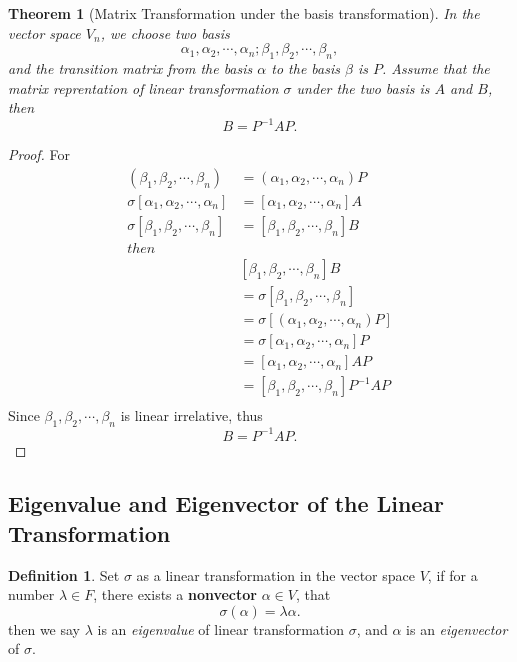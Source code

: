 \documentclass{article}
\newtheorem{theorem}{Theorem}[section]
\theoremstyle{definition}
\newtheorem{defi}{Definition}[section]
\begin{document}
\begin{theorem}[Matrix Transformation under the basis transformation]
    In the vector space $V_{n}$, we choose two basis
    $$\alpha_{1},\alpha_{2},\cdots,\alpha_{n};\beta_{1},\beta_{2},\cdots,\beta_{n},$$
    and the transition matrix from the basis $\alpha$ to the basis $\beta$ is $P$.
    Assume that the matrix reprentation of linear transformation $\sigma$ under the two basis 
    is $A$ and $B$, then 
    $$B=P^{-1}AP.$$
\label{MatrixTransUnderBasisTrans}
\end{theorem}

\begin{proof}
    For 
    \begin{align*}
        (\beta_{1},\beta_{2},\cdots,\beta_{n}) & = (\alpha_{1},\alpha_{2},\cdots,\alpha_{n})P\\
        \sigma[\alpha_{1},\alpha_{2},\cdots,\alpha_{n}] & = [\alpha_{1},\alpha_{2},\cdots,\alpha_{n}]A\\
        \sigma[\beta_{1},\beta_{2},\cdots,\beta_{n}] & = [\beta_{1},\beta_{2},\cdots,\beta_{n}]B\\
        then \\
        & [\beta_{1},\beta_{2},\cdots,\beta_{n}]B\\
        & =\sigma[\beta_{1},\beta_{2},\cdots,\beta_{n}]\\
        & =\sigma[(\alpha_{1},\alpha_{2},\cdots,\alpha_{n})P]\\
        & =\sigma[\alpha_{1},\alpha_{2},\cdots,\alpha_{n}]P\\
        & =[\alpha_{1},\alpha_{2},\cdots,\alpha_{n}]AP\\
        & =[\beta_{1},\beta_{2},\cdots,\beta_{n}]P^{-1}AP\\
    \end{align*}
    Since $\beta_{1},\beta_{2},\cdots,\beta_{n}$ is linear irrelative, 
    thus $$B=P^{-1}AP.$$
\end{proof}

\subsection{Eigenvalue and Eigenvector of the Linear Transformation}

\begin{defi}
    Set $\sigma$ as a linear transformation in the vector space $V$,
    if for a number $\lambda\in F$, there exists a \textbf{nonvector} $\alpha\in V$,
    that 
    $$\sigma(\alpha)=\lambda\alpha.$$
    then we say $\lambda$ is an \textit{eigenvalue} of linear transformation $\sigma$, and
    $\alpha$ is an \textit{eigenvector} of $\sigma$.
\end{defi}
\end{document}
